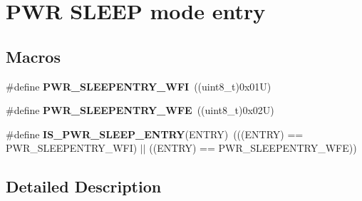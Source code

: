 \hypertarget{group___p_w_r___s_l_e_e_p__mode__entry}{}\section{P\+WR S\+L\+E\+EP mode entry}
\label{group___p_w_r___s_l_e_e_p__mode__entry}
\subsection*{Macros}
\begin{DoxyCompactItemize}
\item 
\mbox{\label{group___p_w_r___s_l_e_e_p__mode__entry_ga4f0f99a3526c57efb3501b016639fa45}} 
\#define {\bfseries P\+W\+R\+\_\+\+S\+L\+E\+E\+P\+E\+N\+T\+R\+Y\+\_\+\+W\+FI}~((uint8\+\_\+t)0x01\+U)
\item 
\mbox{\label{group___p_w_r___s_l_e_e_p__mode__entry_ga2ef4bd42ad37dcfcd0813676087d559e}} 
\#define {\bfseries P\+W\+R\+\_\+\+S\+L\+E\+E\+P\+E\+N\+T\+R\+Y\+\_\+\+W\+FE}~((uint8\+\_\+t)0x02\+U)
\item 
\mbox{\label{group___p_w_r___s_l_e_e_p__mode__entry_ga9b36a9c213a77d36340788b2e7e277ff}} 
\#define {\bfseries I\+S\+\_\+\+P\+W\+R\+\_\+\+S\+L\+E\+E\+P\+\_\+\+E\+N\+T\+RY}(E\+N\+T\+RY)~(((E\+N\+T\+RY) == P\+W\+R\+\_\+\+S\+L\+E\+E\+P\+E\+N\+T\+R\+Y\+\_\+\+W\+FI) $\vert$$\vert$ ((E\+N\+T\+RY) == P\+W\+R\+\_\+\+S\+L\+E\+E\+P\+E\+N\+T\+R\+Y\+\_\+\+W\+FE))
\end{DoxyCompactItemize}


\subsection{Detailed Description}
